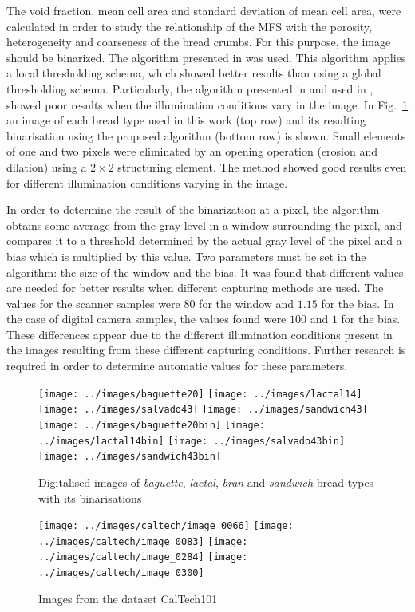 The void fraction, mean cell area and standard deviation of mean cell area, were calculated in order to study the relationship of the MFS with the porosity, heterogeneity and coarseness of the bread crumbs. For this purpose, the image should be binarized. The algorithm presented in \cite{White83} was used. This algorithm applies a local thresholding schema, which showed better results than using a global thresholding schema. Particularly, the algorithm presented in \cite{Huang95} and used in \cite{Gonzales2008}, showed poor results when the illumination conditions vary in the image. In Fig.~\ref{fig:bread} an image of each bread type used in this work (top row) and its resulting binarisation using the proposed algorithm (bottom row) is shown. Small elements of one and two pixels were eliminated by an opening operation (erosion and dilation) using a $2\times2$ structuring element. The method showed good results even for different illumination conditions varying in the image. 

In order to determine the result of the binarization at a pixel, the algorithm obtains some average from the gray level in a window surrounding the pixel, and compares it to a threshold determined by the actual gray level of the pixel and a bias which is multiplied by this value. Two parameters must be set in the algorithm: the size of the window and the bias. It was found that different values are needed for better results when different capturing methods are used. The values for the scanner samples were $80$ for the window and $1.15$ for the bias. In the case of digital camera samples, the values found were $100$ and $1$ for the bias. These differences appear due to the different illumination conditions present in the images resulting from these different capturing conditions. Further research is required in order to determine automatic values for these parameters.

\begin{figure}[htb]
\centering
\texttt{[image: ../images/baguette20]}
\texttt{[image: ../images/lactal14]}
\texttt{[image: ../images/salvado43]}
\texttt{[image: ../images/sandwich43]}
\texttt{[image: ../images/baguette20bin]}
\texttt{[image: ../images/lactal14bin]}
\texttt{[image: ../images/salvado43bin]}
\texttt{[image: ../images/sandwich43bin]}
\caption{Digitalised images of {\em baguette}, {\em lactal}, {\em bran} and {\em sandwich} bread types with its binarisations}
\label{fig:bread}
\end{figure}

\begin{figure}[htb]
\centering
\texttt{[image: ../images/caltech/image\_0066]}
\texttt{[image: ../images/caltech/image\_0083]}
\texttt{[image: ../images/caltech/image\_0284]}
\texttt{[image: ../images/caltech/image\_0300]}
\caption{Images from the dataset CalTech101}
\label{fig:nonbread}
\end{figure}

